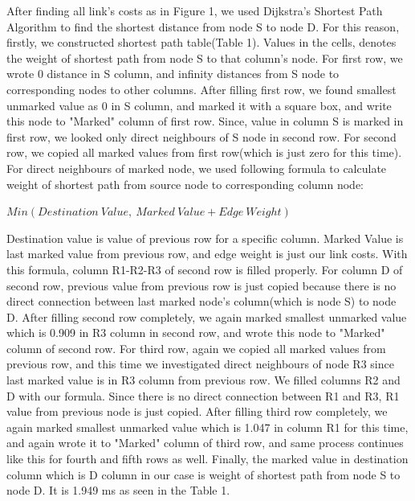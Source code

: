 \documentclass[12pt]{article}
\begin{document}
After finding all link's costs as in Figure 1, we used Dijkstra's Shortest Path Algorithm to find the shortest distance from node S to node D. For this reason, firstly, we constructed shortest path table(Table 1). Values in the cells, denotes the weight of shortest path from node S to that column's node. For first row, we wrote 0 distance in S column, and infinity distances from S node to corresponding nodes to other columns. After filling first row, we found smallest unmarked value as 0 in S column, and marked it with a square box, and write this node to "Marked" column of first row. Since, value in column S is marked in first row, we looked only direct neighbours of S node in second row. For second row, we copied all marked values from first row(which is just zero for this time). For direct neighbours of marked node, we used following formula to calculate weight of shortest path from source node to corresponding column node:
\begin{center}
$Min(Destination \ Value, \ Marked \ Value + Edge \ Weight) $
\end{center}
Destination value is value of previous row for a specific column. Marked Value is last marked value from previous row, and edge weight is just our link costs. With this formula, column R1-R2-R3 of second row is filled properly. For column D of second row, previous value from previous row is just copied because there is no direct connection between last marked node's column(which is node S) to node D. After filling second row completely, we again marked smallest unmarked value which is 0.909 in R3 column in second row, and wrote this node to "Marked" column of second row. For third row, again we copied all marked values from previous row, and this time we investigated direct neighbours of node R3 since last marked value is in R3 column from previous row. We filled columns R2 and D with our formula. Since there is no direct connection between R1 and R3, R1 value from previous node is just copied. After filling third row completely, we again marked smallest unmarked value which is 1.047 in column R1 for this time, and again wrote it to "Marked" column of third row, and same process continues like this for fourth and fifth rows as well. Finally, the marked value in destination column which is D column in our case is weight of shortest path from node S to node D. It is 1.949 ms as seen in the Table 1.
\end{document}
